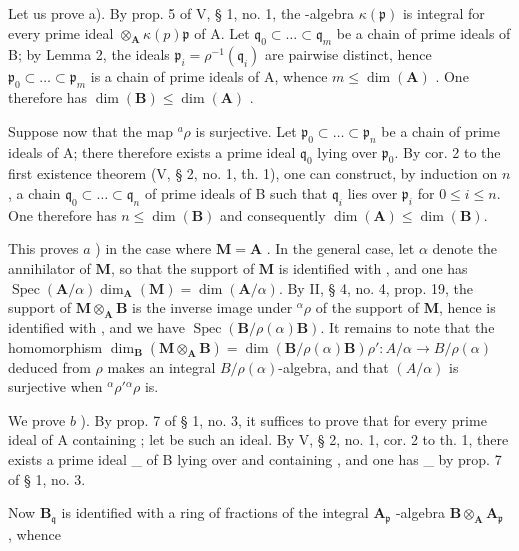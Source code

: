 Let us prove a). By prop. 5 of V, § 1, no. 1, the -algebra \(\kappa(\mathfrak{p})\) is integral for every prime ideal \(\otimes_{\mathbf{A}} \kappa(p)\)\(\mathfrak{p}\) of A. Let \(\mathfrak{q}_0 \subset \ldots \subset \mathfrak{q}_m\) be a chain of prime ideals of B; by Lemma 2, the ideals \(\mathfrak{p}_i = \rho^{-1}(\mathfrak{q}_i)\) are pairwise distinct, hence \(\mathfrak{p}_0 \subset \ldots \subset \mathfrak{p}_m\) is a chain of prime ideals of A, whence \(m \leqslant \dim(\mathbf{A})\) . One therefore has \(\dim(\mathbf{B}) \leqslant \dim(\mathbf{A})\) .

Suppose now that the map \({}^{a}\rho\) is surjective. Let \(\mathfrak{p}_0 \subset \ldots \subset \mathfrak{p}_n\) be a chain of prime ideals of A; there therefore exists a prime ideal \(\mathfrak{q}_0\) lying over \(\mathfrak{p}_0\). By cor. 2 to the first existence theorem (V, § 2, no. 1, th. 1), one can construct, by induction on \(n\), a chain \(\mathfrak{q}_0 \subset \ldots \subset \mathfrak{q}_n\) of prime ideals of B such that \(\mathfrak{q}_i\) lies over \(\mathfrak{p}_i\) for \(0 \leqslant i \leqslant n\). One therefore has \(n \leqslant \dim(\mathbf{B})\) and consequently \(\dim(\mathbf{A}) \leqslant \dim(\mathbf{B})\).

This proves \(a\) ) in the case where \(\mathbf{M} = \mathbf{A}\) . In the general case, let \(\alpha\) denote the annihilator of \(\mathbf{M}\), so that the support of \(\mathbf{M}\) is identified with , and one has \(\operatorname{Spec}(\mathbf{A}/\alpha)\)\(\dim_{\mathbf{A}}(\mathbf{M}) = \dim(\mathbf{A}/\alpha)\). By II, § 4, no. 4, prop. 19, the support of \(\mathbf{M} \otimes_{\mathbf{A}} \mathbf{B}\) is the inverse image under \(^{\alpha}\rho\) of the support of \(\mathbf{M}\), hence is identified with , and we have \(\operatorname{Spec}(\mathbf{B}/\rho(\alpha)\mathbf{B})\). It remains to note that the homomorphism \(\dim_{\mathbf{B}}(\mathbf{M} \otimes_{\mathbf{A}} \mathbf{B}) = \dim(\mathbf{B}/\rho(\alpha)\mathbf{B})\)\(\rho': A/\alpha \to B/\rho(\alpha)\) deduced from \(\rho\) makes  an integral \(B/\rho(\alpha)\)-algebra, and that \((A/\alpha)\) is surjective when \(^{\alpha}\rho'\)\(^{\alpha}\rho\) is.

We prove \(b\) ). By prop. 7 of § 1, no. 3, it suffices to prove that  for every prime ideal  of A containing ; let  be such an ideal. By V, § 2, no. 1, cor. 2 to th. 1, there exists a prime ideal \_ of B lying over  and containing , and one has \_ by prop. 7 of § 1, no. 3.

Now \(\mathbf{B}_{\mathfrak{q}}\) is identified with a ring of fractions of the integral \(\mathbf{A}_{\mathfrak{p}}\) -algebra \(\mathbf{B} \otimes_{\mathbf{A}} \mathbf{A}_{\mathfrak{p}}\) , whence

